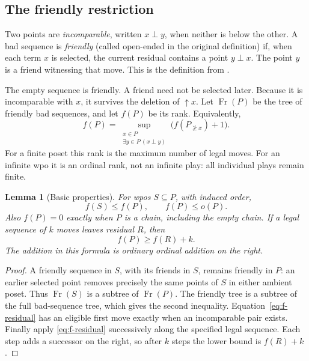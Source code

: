 \documentclass[11pt,letterpaper]{article}
\newtheorem{lemma}[theorem]{Lemma}
\theoremstyle{definition}
\theoremstyle{remark}
\newcommand{\Fr}{\operatorname{Fr}}
\newcommand{\res}[2]{#1_{\not\ge #2}}
\begin{document}
\subsection{The friendly restriction}
Two points are \emph{incomparable}, written $x\perp y$, when neither is
below the other. A bad sequence is \emph{friendly} (called open-ended in
the original definition) if, when each term $x$ is selected, the current
residual contains a point $y\perp x$. The point $y$ is a friend witnessing
that move. This is the definition from
\cite[Definition~5.3.2]{VialardThesis}.

The empty sequence is friendly. A friend need not be selected later.
Because it is incomparable with $x$, it survives the deletion of
$\uparrow x$. Let $\Fr(P)$ be the tree of friendly bad sequences, and
let $f(P)$ be its rank. Equivalently,
\begin{equation}\label{eq:f-residual}
 f(P)=\sup_{\substack{x\in P\\ \exists y\in P\ (x\perp y)}}
       \bigl(f(\res P x)+1\bigr).
\end{equation}
For a finite poset this rank is the maximum number of legal moves. For an
infinite wpo it is an ordinal rank, not an infinite play: all individual
plays remain finite.

\begin{lemma}[Basic properties]\label{lem:basic}
For wpos $S\subseteq P$, with induced order,
\[
 f(S)\le f(P),\qquad f(P)\le o(P).
\]
Also $f(P)=0$ exactly when $P$ is a chain, including the empty chain.
If a legal sequence of $k$ moves leaves residual $R$, then
\begin{equation}\label{eq:moves}
 f(P)\ge f(R)+k.
\end{equation}
The addition in this formula is ordinary ordinal addition on the right.
\end{lemma}
\begin{proof}
A friendly sequence in $S$, with its friends in $S$, remains friendly in
$P$: an earlier selected point removes precisely the same points of $S$
in either ambient poset. Thus $\Fr(S)$ is a subtree of $\Fr(P)$.
The friendly tree is a subtree of the full bad-sequence tree, which gives
the second inequality. Equation~\eqref{eq:f-residual} has an eligible first
move exactly when an incomparable pair exists. Finally apply
\eqref{eq:f-residual} successively along the specified legal sequence.
Each step adds a successor on the right, so after $k$ steps the lower
bound is $f(R)+k$.
\end{proof}
\end{document}
